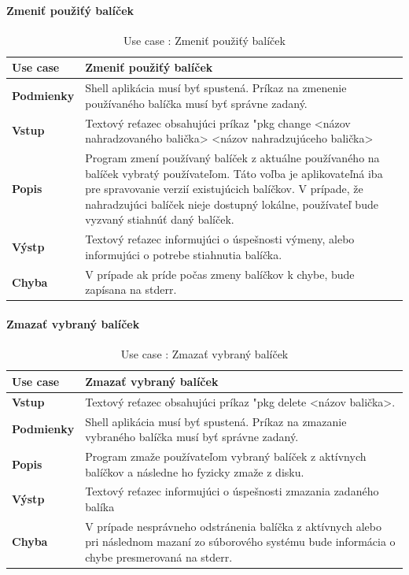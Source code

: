 \paragraph{Zmeniť  použiťý balíček}
\begin{center}
	\begin{table}[htbp]
		\begin{tabular}{|p{2.5cm}|p{14cm}|}
			\hline
			\textbf{Use case} & Zmeniť  použiťý balíček \\ 
			\hline
			\textbf{Podmienky} & Shell aplikácia musí byť spustená. Príkaz na zmenenie používaného balíčka musí byť správne zadaný.\\ 
			\hline
			\textbf{Vstup} & Textový reťazec obsahujúci príkaz "pkg change <názov nahradzovaného balička> <názov nahradzujúceho balička>\\
			\hline
			\textbf{Popis} & Program zmení používaný balíček z aktuálne používaného na balíček vybratý používateľom. Táto voľba je aplikovateľná iba pre spravovanie verzií existujúcich balíčkov. V prípade, že nahradzujúci balíček nieje dostupný lokálne, používateľ bude vyzvaný stiahnúť daný balíček.\\ 
			\hline
			\textbf{Výstp} & Textový reťazec informujúci o úspešnosti výmeny, alebo informujúci o potrebe stiahnutia balíčka.\\
			\hline
			\textbf{Chyba} & V prípade ak príde počas zmeny balíčkov k chybe, bude zapísana na stderr.\\
			\hline
		\end{tabular}
		\label{table:1}
		\caption{Use case : Zmeniť  použiťý balíček}
	\end{table}
\end{center}
\newpage
\paragraph{Zmazať vybraný balíček}
\begin{center}
	\begin{table}[htbp]
		\begin{tabular}{|p{2.5cm}|p{14cm}|}
			\hline
			\textbf{Use case} & Zmazať vybraný balíček \\ 
			\hline
			\textbf{Vstup} & Textový reťazec obsahujúci príkaz "pkg delete <názov balička>.\\
			\hline
			\textbf{Podmienky} & Shell aplikácia musí byť spustená. Príkaz na zmazanie vybraného balíčka musí byť správne zadaný.\\ 
			\hline
			\textbf{Popis} & Program zmaže používateľom vybraný balíček z aktívnych balíčkov a následne ho fyzicky zmaže z disku. \\
			\hline
			\textbf{Výstp} & Textový reťazec informujúci o úspešnosti zmazania zadaného balíka\\
			\hline
			\textbf{Chyba} & V prípade nesprávneho odstránenia balíčka z aktívnych alebo pri následnom mazaní zo súborového systému bude informácia o chybe presmerovaná na stderr.\\
			\hline
		\end{tabular}
		\label{table:1}
		\caption{Use case : Zmazať vybraný balíček}
	\end{table}
\end{center}
